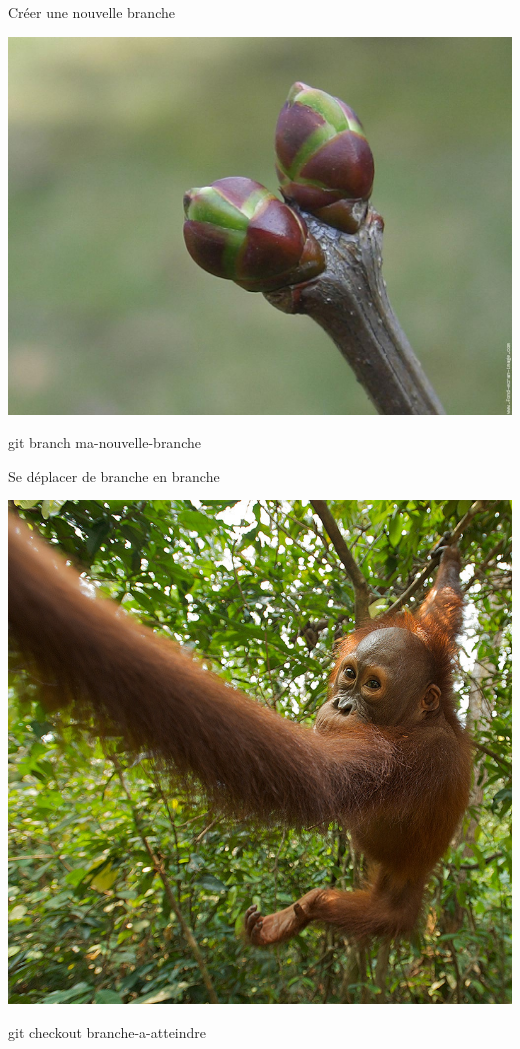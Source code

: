 \begin{frame}{Créer une nouvelle branche}
\begin{center}
\includegraphics[scale=0.2]{bourgeons-3.jpg}

git branch ma-nouvelle-branche
\end{center}
\end{frame}

\begin{frame}{Se déplacer de branche en branche}
\begin{center}
\includegraphics[scale=0.2]{orangutan_203x.jpg}

git checkout branche-a-atteindre
\end{center}
\end{frame}

